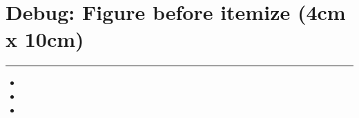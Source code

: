 \documentclass[a4paper,11pt]{article}
\begin{document}
\section*{Debug: Figure before itemize (4cm x 10cm)}
\begin{swarmwrap}%
  \begin{minipage}[t]{4cm}
    \centering
    \rule{\linewidth}{10cm}
  \end{minipage}%
\end{swarmwrap}%
\swarmwrapnext
\lipsum[144]
\begin{itemize}
  \item \lipsum[145][1-3]
  \item \lipsum[146][1-3]
  \item \lipsum[147][1-3]
\end{itemize}
\end{document}
